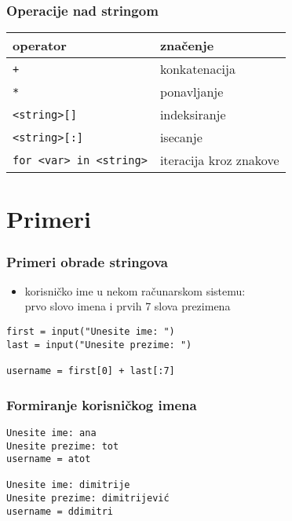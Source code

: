 \documentclass[utf8,compress]{beamer}
\begin{document}
\begin{frame}[fragile]
  \frametitle{Operacije nad stringom}
\begin{center}
\begin{tabular}{l|l}
\textbf{operator} & \textbf{značenje} \\ \hline
\texttt{+} & konkatenacija \\
\texttt{*} & ponavljanje \\
\texttt{<string>[]} & indeksiranje \\
\texttt{<string>[:]} & isecanje \\
\texttt{for <var> in <string>} & iteracija kroz znakove
\end{tabular}
\end{center}
\end{frame}

\section{Primeri}

\begin{frame}[fragile]
  \frametitle{Primeri obrade stringova}
  \begin{itemize}
    \item korisničko ime u nekom računarskom sistemu: \\
      prvo slovo imena i prvih 7 slova prezimena
  \end{itemize}
\begin{verbatim}
first = input("Unesite ime: ")
last = input("Unesite prezime: ")

username = first[0] + last[:7]
\end{verbatim}
\end{frame}

\begin{frame}[fragile]
  \frametitle{Formiranje korisničkog imena}
\begin{verbatim}
Unesite ime: ana
Unesite prezime: tot
username = atot

Unesite ime: dimitrije
Unesite prezime: dimitrijević
username = ddimitri
\end{verbatim}
\end{frame}
\end{document}
